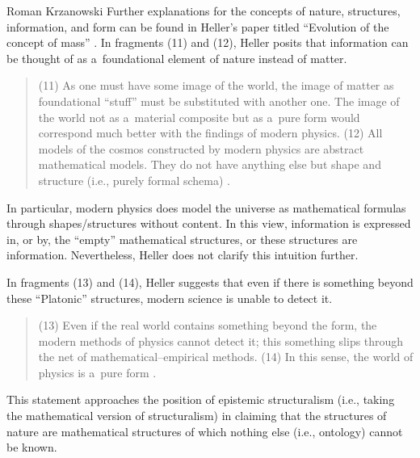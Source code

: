 \begin{artengenv}{Roman Krzanowski}
Further explanations for the concepts of nature, structures, information, and form can be found in Heller's paper titled ``Evolution of the concept of mass'' 
\parencite[][]{heller_ewolucja_1987}. %
 In fragments (11) and (12), Heller posits that information can be thought of as a~foundational element of nature instead of matter.



\begin{quote}
(11) As one must have some image of the world, the image of matter as foundational ``stuff'' must be substituted with another one. The image of the world not as a~material composite but as a~pure form would correspond much better with the findings of modern physics. (12) All models of the cosmos constructed by modern physics are abstract mathematical models. They do not have anything else but shape and structure (i.e., purely formal schema)
\parencite[][]{heller_ewolucja_1987}.%
\end{quote}




In particular, modern physics does model the universe as mathematical formulas through shapes/structures without content. In this view, information is expressed in, or by, the ``empty'' mathematical structures, or these structures are information. Nevertheless, Heller does not clarify this intuition further.



In fragments (13) and (14), Heller suggests that even if there is something beyond these ``Platonic'' structures, modern science is unable to detect it.



\begin{quote}
(13) Even if the real world contains something beyond the form, the modern methods of physics cannot detect it; this something slips through the net of mathematical–empirical methods. (14) In this sense, the world of physics is a~pure form 
\parencite[][]{heller_ewolucja_1987}.%
\end{quote}

This statement approaches the position of epistemic structuralism (i.e., taking the mathematical version of structuralism) in claiming that the structures of nature are mathematical structures of which nothing else (i.e., ontology) cannot be known.




\end{artengenv}
